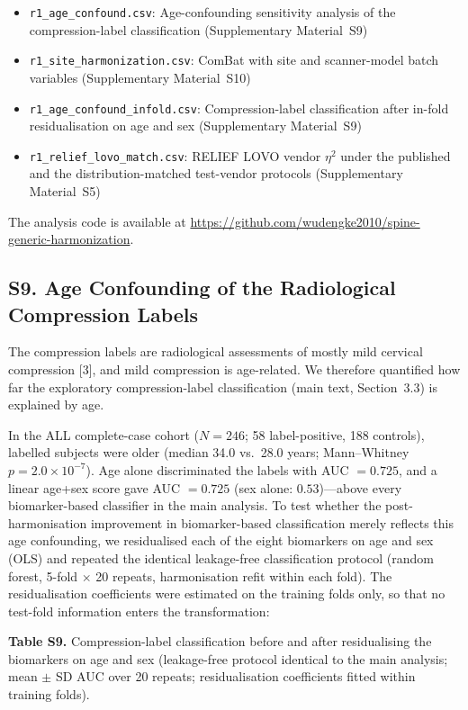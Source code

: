 \documentclass[12pt,a4paper]{article}
\begin{document}
\begin{itemize}[nosep]
  \item \texttt{r1\_age\_confound.csv}: Age-confounding sensitivity analysis of the compression-label classification (Supplementary Material~S9)
  \item \texttt{r1\_site\_harmonization.csv}: ComBat with site and scanner-model batch variables (Supplementary Material~S10)
  \item \texttt{r1\_age\_confound\_infold.csv}: Compression-label classification after in-fold residualisation on age and sex (Supplementary Material~S9)
  \item \texttt{r1\_relief\_lovo\_match.csv}: RELIEF LOVO vendor $\eta^2$ under the published and the distribution-matched test-vendor protocols (Supplementary Material~S5)
\end{itemize}

The analysis code is available at \url{https://github.com/wudengke2010/spine-generic-harmonization}.

\subsection*{S9. Age Confounding of the Radiological Compression Labels}

The compression labels are radiological assessments of mostly mild cervical compression [3], and mild compression is age-related. We therefore quantified how far the exploratory compression-label classification (main text, Section~3.3) is explained by age.

In the ALL complete-case cohort ($N=246$; 58 label-positive, 188 controls), labelled subjects were older (median 34.0 vs.\ 28.0 years; Mann--Whitney $p=2.0\times10^{-7}$). Age alone discriminated the labels with AUC $=0.725$, and a linear age+sex score gave AUC $=0.725$ (sex alone: $0.53$)---above every biomarker-based classifier in the main analysis. To test whether the post-harmonisation improvement in biomarker-based classification merely reflects this age confounding, we residualised each of the eight biomarkers on age and sex (OLS) and repeated the identical leakage-free classification protocol (random forest, 5-fold $\times$ 20 repeats, harmonisation refit within each fold). The residualisation coefficients were estimated on the training folds only, so that no test-fold information enters the transformation:

\textbf{Table S9.} Compression-label classification before and after residualising the biomarkers on age and sex (leakage-free protocol identical to the main analysis; mean $\pm$ SD AUC over 20 repeats; residualisation coefficients fitted within training folds).
\end{document}
